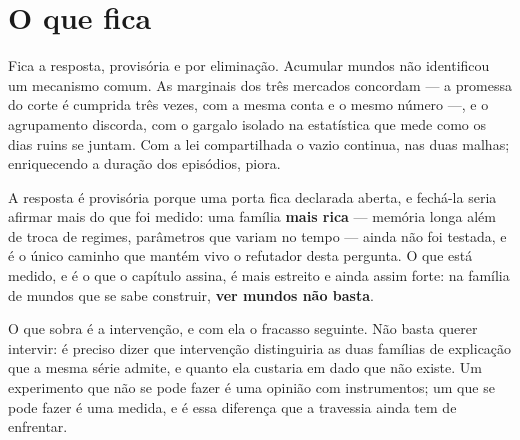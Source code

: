 \section{O que fica}

Fica a resposta, provisória e por eliminação. Acumular mundos não identificou um mecanismo
comum. As marginais dos três mercados concordam --- a promessa do corte é cumprida
três vezes, com a mesma conta e o mesmo número ---, e o agrupamento discorda, com o gargalo
isolado na estatística que mede como os dias ruins se juntam\cite{bing2023invariance}. Com a lei compartilhada o vazio
continua, nas duas malhas; enriquecendo a duração dos episódios, piora.

A resposta é provisória porque uma porta fica declarada aberta, e fechá-la seria afirmar mais do
que foi medido: uma família \textbf{mais rica} --- memória longa além de troca de regimes, parâmetros
que variam no tempo \cite{palma2010efficient,dahlhaus2006nonparametric,palma2013estimation} --- ainda não foi testada, e é o único caminho que mantém vivo o refutador
desta pergunta. O que está medido, e é o que o capítulo assina, é mais estreito e ainda assim
forte: na família de mundos que se sabe construir, \textbf{ver mundos não basta}.

O que sobra é a intervenção, e com ela o fracasso seguinte. Não basta querer intervir: é preciso
dizer que intervenção distinguiria as duas famílias de explicação que a mesma série admite, e
quanto ela custaria em dado que não existe. Um experimento que não se pode fazer é uma opinião com
instrumentos; um que se pode fazer é uma medida, e é essa diferença que a travessia
ainda tem de enfrentar.

